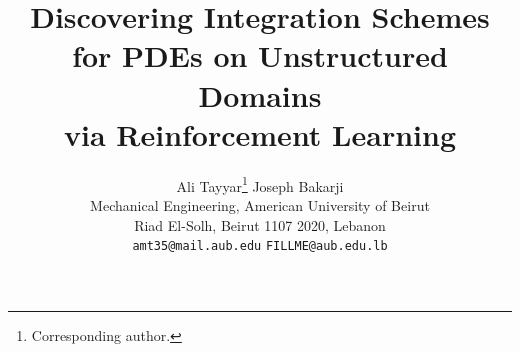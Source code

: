 \theoremstyle{plain}
\newtheorem{theorem}{Theorem}
\newtheorem{proposition}[theorem]{Proposition}
\theoremstyle{remark}
\newtheorem{remark}[theorem]{Remark}


\title{Discovering Integration Schemes for PDEs on Unstructured Domains\\
       via Reinforcement Learning}


\author{%
  Ali Tayyar\thanks{Corresponding author.} \quad Joseph Bakarji \\
  Mechanical Engineering, American University of Beirut \\
  Riad El-Solh, Beirut 1107 2020, Lebanon \\
  \texttt{amt35@mail.aub.edu} \quad \texttt{FILLME@aub.edu.lb} \\
}

